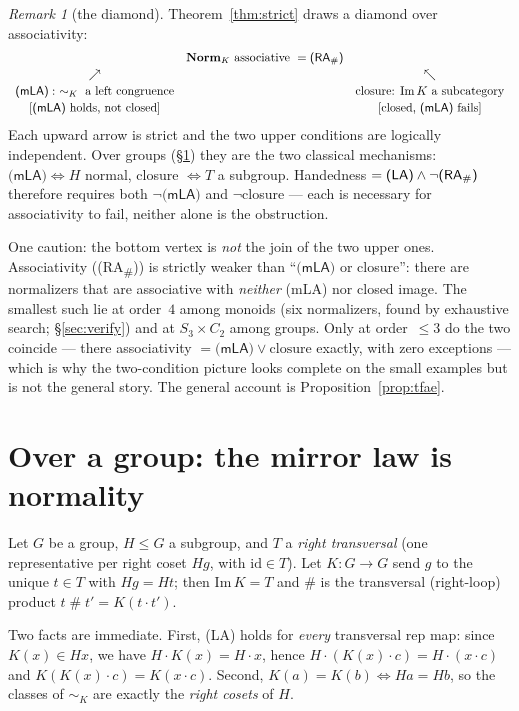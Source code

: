 \documentclass[11pt]{amsart}
\theoremstyle{plain}
\theoremstyle{definition}
\theoremstyle{remark}
\newtheorem{remark}[theorem]{Remark}
\newcommand{\Norm}{\mathbf{Norm}}
\newcommand{\Img}{\mathrm{Im}\,}
\newcommand{\id}{\mathrm{id}}
\newcommand{\sh}{\mathbin{\#}}
\newcommand{\LA}{\textsf{(LA)}}
\newcommand{\mLA}{\textsf{(mLA)}}
\newcommand{\RA}{\textsf{(RA}\textsubscript{\#}\textsf{)}}
\newcommand{\simK}{\mathrel{\sim_{K}}}
\begin{document}
\begin{remark}[the diamond]
\label{rem:diamond}
Theorem~\ref{thm:strict} draws a diamond over associativity:
\[
\begin{array}{ccc}
 & \Norm_K\text{ associative }=\RA{} & \\[2pt]
 \nearrow & & \nwarrow \\[2pt]
 \mLA{}:\ \simK\text{ a left congruence} & & \text{closure: }\Img K\text{ a subcategory}\\[2pt]
 \text{[\mLA{} holds, not closed]} & & \text{[closed, \mLA{} fails]}
\end{array}
\]
Each upward arrow is strict and the two upper conditions are logically independent. Over groups
(§\ref{sec:thm3}) they are the two classical mechanisms: $\mLA{}\Leftrightarrow H$ normal, closure
$\Leftrightarrow T$ a subgroup. Handedness $=\LA{}\wedge\neg\RA{}$ therefore requires both $\neg\mLA{}$
and $\neg$closure --- each is necessary for associativity to fail, neither alone is the obstruction.

One caution: the bottom vertex is \emph{not} the join of the two upper ones. Associativity (\RA{}) is
strictly weaker than ``$\mLA{}$ or closure'': there are normalizers that are associative with
\emph{neither} \mLA{} nor closed image. The smallest such lie at order~$4$ among monoids (six
normalizers, found by exhaustive search; §\ref{sec:verify}) and at $S_3\times C_2$ among groups. Only
at order~$\le3$ do the two coincide --- there associativity $=\mLA{}\vee\text{closure}$ exactly, with
zero exceptions --- which is why the two-condition picture looks complete on the small examples but is
not the general story. The general account is Proposition~\ref{prop:tfae}.
\end{remark}

\section{Over a group: the mirror law is normality}
\label{sec:thm3}

Let $G$ be a group, $H\le G$ a subgroup, and $T$ a \emph{right transversal} (one representative per
right coset $Hg$, with $\id\in T$). Let $K\colon G\to G$ send $g$ to the unique $t\in T$ with $Hg=Ht$;
then $\Img K=T$ and $\sh$ is the transversal (right-loop) product $t\sh t'=K(t\cdot t')$.

Two facts are immediate. First, \LA{} holds for \emph{every} transversal rep map: since $K(x)\in Hx$,
we have $H\cdot K(x)=H\cdot x$, hence $H\cdot(K(x)\cdot c)=H\cdot(x\cdot c)$ and
$K(K(x)\cdot c)=K(x\cdot c)$. Second, $K(a)=K(b)\Leftrightarrow Ha=Hb$, so the classes of $\simK$ are
exactly the \emph{right cosets} of $H$.
\end{document}
